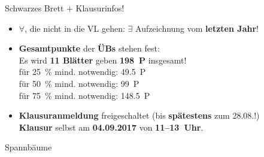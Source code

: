 





	

\begin{frame}{Schwarzes Brett + Klausurinfos!}
	\begin{itemize}
		\item $\forall$, die nicht in die VL gehen: $\exists$ Aufzeichnung vom \textbf{letzten Jahr}! \\
		\item \textbf{Gesamtpunkte} der \textbf{ÜBs} stehen fest: \\
		Es wird \textbf{11 Blätter} geben \impl \textbf{198~P} insgesamt! \\
		\impl für 25~\% mind. notwendig: 49.5~P \\
		\impl für 50~\% mind. notwendig: 99~P \\
		\impl für 75~\% mind. notwendig: 148.5~P \\
		\item \textbf{Klausuranmeldung} freigeschaltet (bis \textbf{spätestens} zum 28.08.!) \\
		\textbf{Klausur} selbst am \textbf{04.09.2017} von \textbf{11–13~Uhr}.
	\end{itemize}
\end{frame}

\begin{headframe}
	Spannbäume
\end{headframe}

